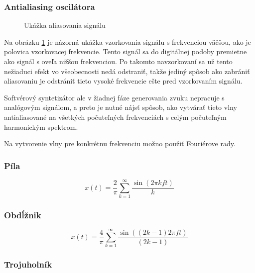 \subsubsection{Antialiasing oscilátora}
\label{antialiasing}
\begin{figure}[h]
\centering
{}
\caption{\label{obr07} Ukážka aliasovania signálu}
\end{figure}

Na obrázku \ref{obr07} je názorná ukážka vzorkovania signálu s frekvenciou väčšou, ako je polovica vzorkovacej frekvencie. Tento signál sa do digitálnej podoby premietne ako signál s oveľa nižšou frekvenciou. Po takomto navzorkovaní sa už tento nežiaduci efekt vo všeobecnosti nedá odstraniť, takže jediný spôsob ako zabrániť aliasovaniu je odstrániť tieto vysoké frekvencie ešte pred vzorkovaním signálu.

Softvérový syntetizátor ale v žiadnej fáze generovania zvuku nepracuje s analógovým signálom, a preto je nutné nájsť spôsob, ako vytvárať tieto vlny antialiasované na všetkých počuteľných frekvenciách s celým počuteľným harmonickým spektrom.

Na vytvorenie vlny pre konkrétnu frekvenciu možno použiť Fouriérove rady. 

\subsubsection*{Píla}

\begin{equation*}
x(t) = \frac{2}{\pi} \sum_{k=1}^\infty \frac{\sin(2\pi k f t)}{k}
\end{equation*}

\subsubsection*{Obdĺžnik}

\begin{equation*}
x(t) = \frac{4}{\pi} \sum_{k=1}^\infty  \frac{\sin((2k-1) 2 \pi f t)}{(2k-1)}
\end{equation*}

\subsubsection*{Trojuholník}

